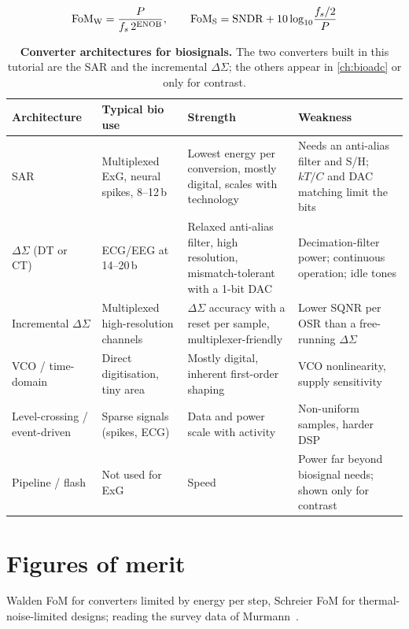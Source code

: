 \begin{keyeq}
\begin{equation}
  \mathrm{FoM_W} = \frac{P}{f_s\,2^{\mathrm{ENOB}}}, \qquad \mathrm{FoM_S} = \mathrm{SNDR} + 10\log_{10}\!\frac{f_s/2}{P}
  \label{eq:fom}
\end{equation}
\end{keyeq}

\begin{table}[tbp]
\centering\small
\caption{\textbf{Converter architectures for biosignals.} The two converters built in this tutorial are the SAR and the incremental $\Delta\Sigma$; the others appear in \cref{ch:bioadc} or only for contrast.}
\label{tab:ch14-arch}
\begin{tabularx}{\linewidth}{@{}l L L L@{}}
\toprule
Architecture & Typical bio use & Strength & Weakness \\
\midrule
SAR & Multiplexed ExG, neural spikes, 8--12\,b & Lowest energy per conversion, mostly digital, scales with technology & Needs an anti-alias filter and S/H; $kT/C$ and DAC matching limit the bits \\
$\Delta\Sigma$ (DT or CT) & ECG/EEG at 14--20\,b & Relaxed anti-alias filter, high resolution, mismatch-tolerant with a 1-bit DAC & Decimation-filter power; continuous operation; idle tones \\
Incremental $\Delta\Sigma$ & Multiplexed high-resolution channels & $\Delta\Sigma$ accuracy with a reset per sample, multiplexer-friendly & Lower SQNR per OSR than a free-running $\Delta\Sigma$ \\
VCO / time-domain & Direct digitisation, tiny area & Mostly digital, inherent first-order shaping & VCO nonlinearity, supply sensitivity \\
Level-crossing / event-driven & Sparse signals (spikes, ECG) & Data and power scale with activity & Non-uniform samples, harder DSP \\
Pipeline / flash & Not used for ExG & Speed & Power far beyond biosignal needs; shown only for contrast \\
\bottomrule
\end{tabularx}
\end{table}

\section{Figures of merit}\label{sec:ch14-2}
Walden FoM for converters limited by energy per step, Schreier FoM for thermal-noise-limited designs; reading the survey data of Murmann~\cite{murmannsurvey}.

